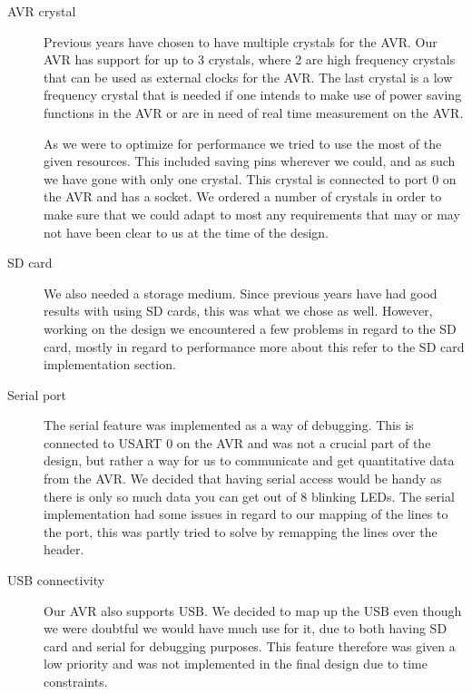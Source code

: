\begin{description}

\item[AVR crystal] \hfill

Previous years have chosen to have multiple crystals for the AVR. Our AVR has support for up to 3 crystals, where 2 are high frequency crystals that can be used as external clocks for the AVR. The last crystal is a low frequency crystal that is needed if one intends to make use of power saving functions in the AVR or are in need of real time measurement on the AVR. 

As we were to optimize for performance we tried to use the most of the given resources. This included saving pins wherever we could, and as such we have gone with only one crystal. This crystal is connected to port 0 on the AVR and has a socket. We ordered a number of crystals in order to make sure that we could adapt to most any requirements that may or may not have been clear to us at the time of the design.

\item[SD card]  \hfill %

We also needed a storage medium. Since previous years have had good results with
using \ac{SD} cards, this was what we chose as well. However, working on the
design we encountered a few problems in regard to the \ac{SD} card, mostly in
regard to performance more about this refer to the \ac{SD} card implementation
section. 

\item[Serial port]  \hfill

The serial feature was implemented as a way of debugging. This is connected to
\ac{USART} 0 on the AVR and was not a crucial part of the design, but rather a way for us to communicate and get quantitative data from the AVR. We decided that having serial access would be handy as there is only so much data you can get out of 8 blinking LEDs. The serial implementation had some issues in regard to our mapping of the lines to the port, this was partly tried to solve by remapping the lines over the header.

\item[USB connectivity]  \hfill 

Our AVR also supports \ac{USB}. We decided to map up the \ac{USB} even though we were doubtful we would have much use for it, due to both having \ac{SD} card and serial for debugging purposes. This feature therefore was given a low priority and was not implemented in the final design due to time constraints.
 

\end{description}
